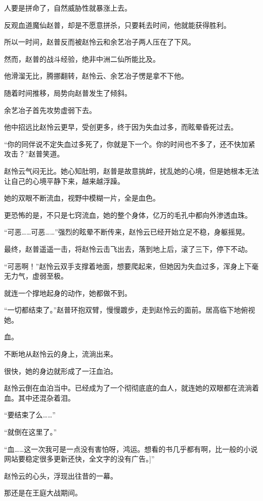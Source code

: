 
\begin{this_body}

人要是拼命了，自然威胁性就暴涨上去。

反观血道魔仙赵普，却是不愿意拼杀，只要耗去时间，他就能获得胜利。

所以一时间，赵普反而被赵怜云和余艺冶子两人压在了下风。

然而，赵普的战斗经验，绝非中洲二仙所能比及。

他滑溜无比，腾挪翻转，赵怜云、余艺冶子愣是拿不下他。

随着时间推移，局势向赵普发生了倾斜。

余艺冶子首先攻势虚弱下去。

他中招远比赵怜云更早，受创更多，终于因为失血过多，而眩晕昏死过去。

“你的同伴说不定失血过多死了，你就是下一个。你的时间也不多了，还不快加紧攻击？”赵普笑道。

赵怜云气闷无比。她心知肚明，赵普是故意挑衅，扰乱她的心境，但是她根本无法让自己的心境平静下来，越来越浮躁。

她的双眼不断流血，视野中模糊一片，全是血色。

更恐怖的是，不只是七窍流血，她的整个身体，亿万的毛孔中都向外渗透血珠。

“可恶……可恶……”强烈的眩晕不断传来，赵怜云已经开始立足不稳，身躯摇晃。

最终，赵普遥遥一击，将赵怜云击飞出去，落到地上后，滚了三下，停下不动。

“可恶啊！”赵怜云双手支撑着地面，想要爬起来，但她因为失血过多，浑身上下毫无力气，虚弱至极。

就连一个撑地起身的动作，她都做不到。

“一切都结束了。”赵普环抱双臂，慢慢踱步，走到赵怜云的面前。居高临下地俯视她。

血。

不断地从赵怜云的身上，流淌出来。

很快，她的身边就形成了一汪血泊。

赵怜云倒在血泊当中。已经成为了一个彻彻底底的血人，就连她的双眼都在流淌着血。其中还混杂着泪。

“要结束了么……”

“就倒在这里了。”

“血……这一次我可是一点没有害怕呀，鸿运。想看的书几乎都有啊，比一般的小说网站要稳定很多更新还快，全文字的没有广告。]”

赵怜云的心头，浮现出往昔的一幕。

那还是在王庭大战期间。


\end{this_body}

